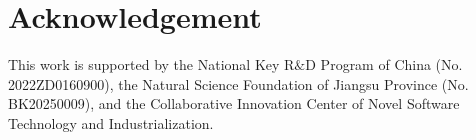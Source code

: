 \documentclass{article}
\begin{document}








\clearpage

\section*{Acknowledgement}
This work is supported by the National Key R$\&$D Program of China (No. 2022ZD0160900), the Natural Science Foundation of Jiangsu Province (No. BK20250009), and the Collaborative Innovation Center of Novel Software Technology and Industrialization.

{
\small


}

\clearpage

\appendix



% 
\end{document}
